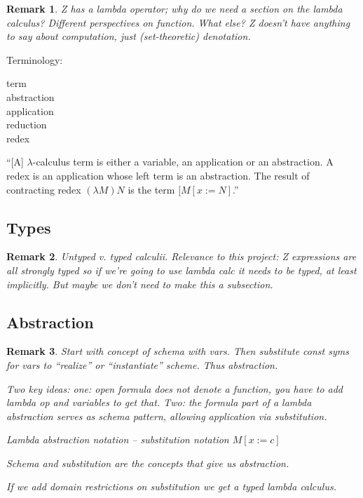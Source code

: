 \documentclass[12pt]{tufte-handout}
\numberwithin{equation}{subsection}
\numberwithin{equation}{subsection}
\newtheorem{remark}{Remark}
\begin{document}
\begin{remark}
  Z has a lambda operator; why do we need a section on the lambda
  calculus?  Different perspectives on function.  What else?  Z
  doesn't have anything to say about computation, just (set-theoretic)
  denotation.
\end{remark}

Terminology:
\begin{description}
\item [term]
\item [abstraction]
\item [application]
\item [reduction]
\item [redex]
\end{description}

``[A] \(\lambda\)-calculus term is either a variable, an application
or an abstraction.  A redex is an application whose left term is an
abstraction.  The result of contracting redex \((\lambda M) N\) is the
term \([M[x:=N]\).''

  \subsection{Types}
  \label{subs:lambdatypes}

  \begin{remark}
    Untyped v. typed calculii.  Relevance to this project: Z expressions
    are all strongly typed so if we're going to use lambda calc it needs
    to be typed, at least implicitly.  But maybe we don't need to make
    this a subsection.
  \end{remark}

  \subsection{Abstraction}
  \label{subs:lambda}

\begin{remark}
  Start with concept of schema with vars.  Then substitute const syms
  for vars to ``realize'' or ``instantiate'' scheme.  Thus
  abstraction.

  Two key ideas: one: open formula does not denote a function, you
  have to add lambda op \textit{and variables} to get that.  Two: the
  formula part of a lambda abstraction serves as schema pattern,
  allowing application via substitution.

  Lambda abstraction notation -- substitution notation \(M[x:=c]\)

  Schema and substitution are the concepts that give us abstraction.

  If we add domain restrictions on substitution we get a typed lambda
  calculus.


\end{remark}
\end{document}
